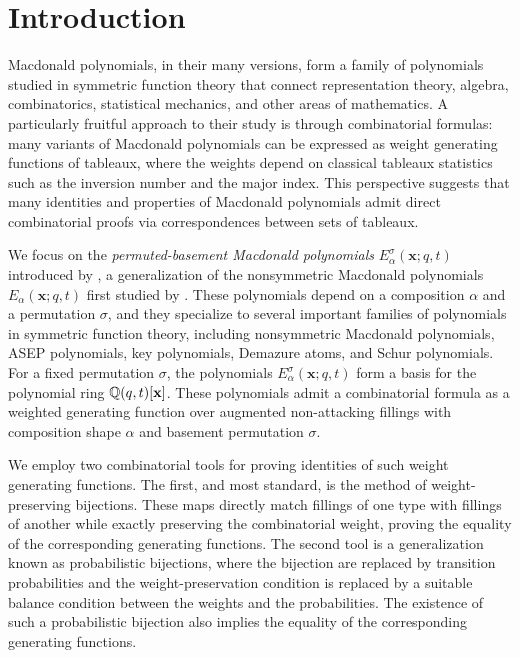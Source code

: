 \chapter{Introduction} \label{chap:introduction}

Macdonald polynomials, in their many versions, form a family of polynomials studied in symmetric function theory that connect representation theory, algebra, combinatorics, statistical mechanics, and other areas of mathematics.
A particularly fruitful approach to their study is through combinatorial formulas:
many variants of Macdonald polynomials can be expressed as weight generating functions of tableaux,
where the weights depend on classical tableaux statistics such as the inversion number and the major index.
This perspective suggests that many identities and properties of Macdonald polynomials admit direct combinatorial proofs via correspondences between sets of tableaux.

We focus on the \emph{permuted-basement Macdonald polynomials} \(E_\alpha^\sigma(\mathbf{x};q,t)\) introduced by \textcite{Fer11},
a generalization of the nonsymmetric Macdonald polynomials \(E_\alpha(\mathbf{x};q,t)\) first studied by \textcite{Opd95,Mac96,Che95}.
These polynomials depend on a composition \(\alpha\) and a permutation \(\sigma\),
and they specialize to several important families of polynomials in symmetric function theory,
including nonsymmetric Macdonald polynomials,
ASEP polynomials,
key polynomials,
Demazure atoms,
and Schur polynomials.
For a fixed permutation \(\sigma\), the polynomials \(E_\alpha^\sigma(\mathbf{x};q,t)\) form a basis for the polynomial ring \(\mathbb{Q}(q, t)[\mathbf{x}]\).
These polynomials admit a combinatorial formula as a weighted generating function over augmented non-attacking fillings with composition shape \(\alpha\) and basement permutation \(\sigma\).

We employ two combinatorial tools for proving identities of such weight generating functions.
The first, and most standard, is the method of weight-preserving bijections.
These maps directly match fillings of one type with fillings of another while exactly preserving the combinatorial weight, proving the equality of the corresponding generating functions.
The second tool is a generalization known as probabilistic bijections,
where the bijection are replaced by transition probabilities and the weight-preservation condition is replaced by a suitable balance condition between the weights and the probabilities.
The existence of such a probabilistic bijection also implies the equality of the corresponding generating functions.

